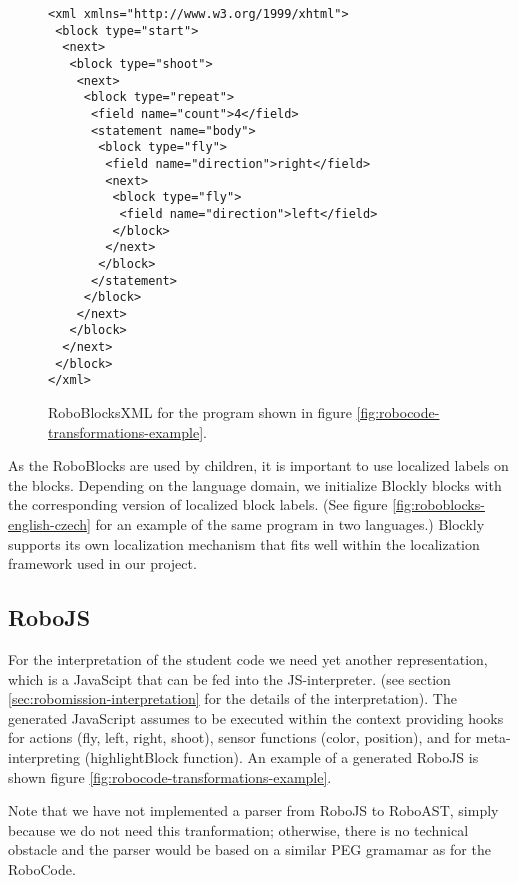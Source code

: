 \begin{figure}[h]
\begin{lstlisting}
<xml xmlns="http://www.w3.org/1999/xhtml">
 <block type="start">
  <next>
   <block type="shoot">
    <next>
     <block type="repeat">
      <field name="count">4</field>
      <statement name="body">
       <block type="fly">
        <field name="direction">right</field>
        <next>
         <block type="fly">
          <field name="direction">left</field>
         </block>
        </next>
       </block>
      </statement>
     </block>
    </next>
   </block>
  </next>
 </block>
</xml>
\end{lstlisting}
  \caption{%
    RoboBlocksXML for the program shown in figure %
    \ref{fig:robocode-transformations-example}.}
\label{fig:roboblocks-xml}
\end{figure}

As the RoboBlocks are used by children, it is important to use localized labels
on the blocks.
Depending on the language domain, we initialize Blockly blocks with the corresponding
version of localized block labels.
(See figure \ref{fig:roboblocks-english-czech} for an example of the same
program in two languages.)
Blockly supports its own localization mechanism that fits well
within the localization framework used in our project.


\subsection{RoboJS}
\label{sec:robomission-robojs}

For the interpretation of the student code we need yet another representation,
which is a JavaScipt that can be fed into the JS-interpreter.
(see section \ref{sec:robomission-interpretation} for the details of the interpretation).
The generated JavaScript assumes to be executed within the context providing hooks
for actions (fly, left, right, shoot), sensor functions (color, position), and for meta-interpreting (highlightBlock function).
An example of a generated RoboJS is shown figure \ref{fig:robocode-transformations-example}.

Note that we have not implemented a parser from RoboJS to RoboAST,
simply because we do not need this tranformation;
otherwise, there is no technical obstacle and the parser would be based on a similar PEG gramamar as for the RoboCode.



